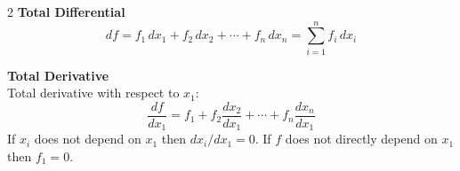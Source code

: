 \documentclass{./../../latex/tests}
\begin{document}
\begin{multicols}{2}
\textbf{Total Differential}
\[ df = f_{1}\, dx_{1} + f_{2}\, dx_{2} + \cdots + f_{n}\, dx_{n} = \sum_{i=1}^{n} f_{i}\, dx_{i} \]

\textbf{Total Derivative}\\
Total derivative with respect to $x_1$:
\[ \frac{df}{dx_1} = f_{1} + f_{2} \frac{dx_{2}}{dx_1} + \cdots + f_{n} \frac{dx_{n}}{dx_1} \]
If $x_i$ does not depend on $x_1$ then $dx_i/dx_1 = 0$. If $f$ does not directly depend on $x_1$ then $f_{1} = 0$.


\end{multicols}
\end{document}
